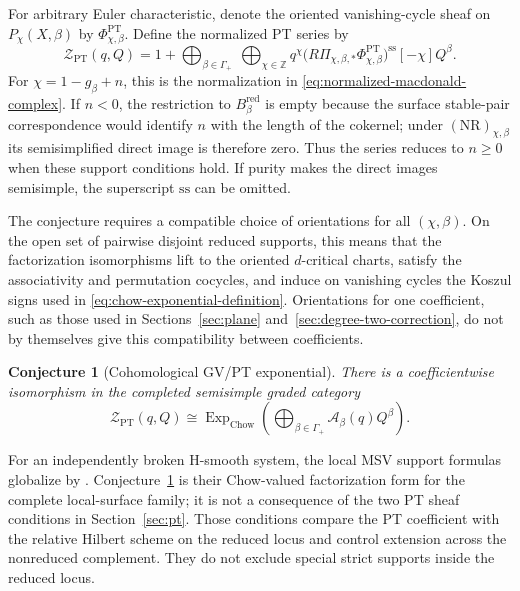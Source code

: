 \documentclass[11pt,reqno]{amsart}
\newtheorem{conjecture}[theorem]{Conjecture}
\theoremstyle{definition}
\newcommand{\PT}{\operatorname{PT}}
\newcommand{\red}{\mathrm{red}}
\newcommand{\ExpChow}{\operatorname{Exp}_{\mathrm{Chow}}}
\begin{document}
For arbitrary Euler characteristic, denote the oriented vanishing-cycle
sheaf on $P_\chi(X,\beta)$ by $\Phi_{\chi,\beta}^{\PT}$.  Define the
normalized PT series by
\begin{equation}\label{eq:normalized-pt-series}
 \mathcal Z_{\PT}(q,Q)
 =1+\bigoplus_{\beta\in\Gamma_+}\ \bigoplus_{\chi\in\mathbb Z}
 q^\chi
 \bigl(R\Pi_{\chi,\beta,*}\Phi_{\chi,\beta}^{\PT}\bigr)^{\mathrm{ss}}
 [-\chi]Q^\beta.
\end{equation}
For $\chi=1-g_\beta+n$, this is the normalization in
\eqref{eq:normalized-macdonald-complex}.  If $n<0$, the restriction to
$B_\beta^{\red}$ is empty because the surface stable-pair correspondence
would identify $n$ with the length of the cokernel; under
$(\mathrm{NR})_{\chi,\beta}$ its semisimplified direct image is therefore
zero.  Thus the series reduces to $n\ge0$ when these support conditions hold.
If purity makes the direct images semisimple, the superscript ${\mathrm{ss}}$
can be omitted.

The conjecture requires a compatible choice of orientations for all
$(\chi,\beta)$.  On the open set of pairwise disjoint reduced supports, this
means that the factorization isomorphisms lift to the oriented $d$-critical
charts, satisfy the associativity and permutation cocycles, and induce on
vanishing cycles the Koszul signs used in
\eqref{eq:chow-exponential-definition}.  Orientations for one coefficient,
such as those used in Sections~\ref{sec:plane}
and~\ref{sec:degree-two-correction}, do
not by themselves give this compatibility between coefficients.

\begin{conjecture}[Cohomological GV/PT exponential]
\label{conj:cohomological-exponential}
There is a coefficientwise isomorphism in the completed semisimple graded
category
\begin{equation}\label{eq:cohomological-exponential}
 \mathcal Z_{\PT}(q,Q)
 \cong
 \ExpChow\!\left(
   \bigoplus_{\beta\in\Gamma_+}\mathcal A_\beta(q)Q^\beta\right).
\end{equation}
\end{conjecture}

For an independently broken H-smooth system, the local MSV support formulas
globalize by \cite[Corollary~5.16]{MSV}.
Conjecture~\ref{conj:cohomological-exponential} is their Chow-valued
factorization form for
the complete local-surface family; it is not a consequence of the two PT
sheaf conditions in Section~\ref{sec:pt}.  Those conditions compare the PT
coefficient with the relative Hilbert scheme on the reduced locus and control
extension across the nonreduced complement.  They do not exclude special
strict supports inside the reduced locus.
\end{document}

